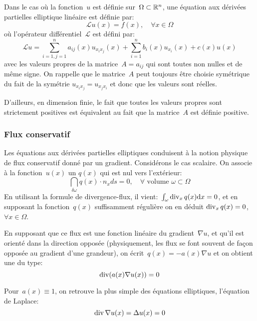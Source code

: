 Dans le cas où la fonction~$u$ est définie sur~$\Omega\subset\mathbb R^n$, une équation aux dérivées partielles elliptique linéaire est définie par:
\begin{equation} \mathcal{L}u(x) = f(x),\quad \forall x\in\Omega \end{equation}
où l'opérateur différentiel~$\mathcal{L}$ est défini par:
\begin{equation}
\mathcal{L}u = \sum_{i=1, j=1}^n a_{ij}(x)u_{x_ix_j} (x) +
\sum_{i=1}^n b_i(x)u_{x_i}(x) + c(x)u(x)
\end{equation}
avec les valeurs propres de la matrice~$A = a_{ij}$ qui sont toutes non nulles et de même signe. 
On rappelle que le matrice~$A$ peut toujours être choisie symétrique du fait de la symétrie $u_{x_ix_j} = u_{x_jx_i}$ et donc que les valeurs sont réelles.

D'ailleurs, en dimension finie, le fait que toutes les valeurs propres sont strictement positives est équivalent au fait que la matrice~$A$ est définie positive.

\medskip
\subsubsection{Flux conservatif}
Les équations aux dérivées partielles elliptiques conduisent à la notion physique de flux conservatif donné
par un gradient. Considérons le cas scalaire. On associe à la fonction~$u(x)$ un 
$q(x)$ qui est nul vers l'extérieur:
\begin{equation}\dint_{\delta\omega} q(x)\cdot n_x ds=0,\quad\forall\text{ volume }\omega\subset\Omega\end{equation}
En utilisant la formule de divergence-flux, il vient:~$\int_\omega \operatorname{div}_xq(x)\mathrm dx=0$, et en supposant la fonction~$q(x)$ suffisamment régulière on en déduit $\operatorname{div}_xq(x)=0$, $\forall x\in\Omega$.

En supposant que ce flux est une fonction linéaire du gradient~$\nabla u$, et qu'il est orienté dans la direction opposée (physiquement, les flux se font souvent de façon opposée au gradient d'une grandeur), on écrit~$q(x) = -a(x)\nabla u$ et on obtient une  du type:
\begin{equation}\operatorname{div}(a(x)\nabla u(x)) = 0\end{equation}

Pour~$a(x) \equiv 1$, on retrouve la plus simple des équations elliptiques, l'équation de Laplace:
\begin{equation}\operatorname{div}\nabla u(x) = \Delta u(x) = 0\end{equation}

